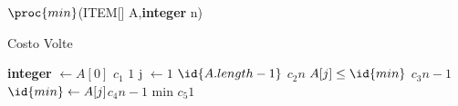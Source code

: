 \begin{algorithm}
\caption{$\proc{min}$(ITEM[] A,\textbf{integer} n)} \qquad Costo \quad Volte
\begin{codebox}
  \li \textbf{integer}  $\gets A[0]$ \>\>\>\>\>\> $c_1$ \>\>\> $1$
  \li \For j $\gets 1$ \To $\id{A.length-1}$ \>\>\>\>\>$c_2$\>\>\>$n$
      \Do
  \li        \If $A[j] \leq \id{min}$ \>\>\>\>\>$c_3$\>\>\>$n-1$
             \Do
  \li                  $\id{min} \gets A[j]$\>\>\>\>$c_4$\>\>\>$n-1$
             \End
      \End
  \li \Return min \>\>\>\>\>\>$c_5$\>\>\>$1$
\end{codebox}
\end{algorithm}
